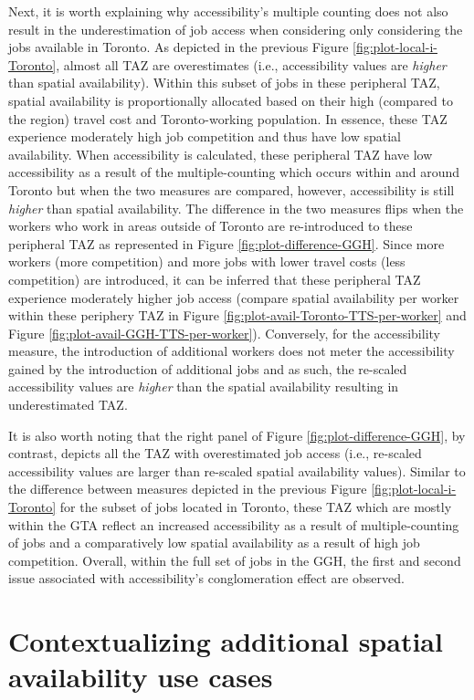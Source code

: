 \documentclass[]{elsarticle} %
\begin{document}
Next, it is worth explaining why accessibility's multiple counting does
not also result in the underestimation of job access when considering
only considering the jobs available in Toronto. As depicted in the
previous Figure \ref{fig:plot-local-i-Toronto}, almost all TAZ are
overestimates (i.e., accessibility values are \emph{higher} than spatial
availability). Within this subset of jobs in these peripheral TAZ,
spatial availability is proportionally allocated based on their high
(compared to the region) travel cost and Toronto-working population. In
essence, these TAZ experience moderately high job competition and thus
have low spatial availability. When accessibility is calculated, these
peripheral TAZ have low accessibility as a result of the
multiple-counting which occurs within and around Toronto but when the
two measures are compared, however, accessibility is still \emph{higher}
than spatial availability. The difference in the two measures flips when
the workers who work in areas outside of Toronto are re-introduced to
these peripheral TAZ as represented in Figure
\ref{fig:plot-difference-GGH}. Since more workers (more competition) and
more jobs with lower travel costs (less competition) are introduced, it
can be inferred that these peripheral TAZ experience moderately higher
job access (compare spatial availability per worker within these
periphery TAZ in Figure \ref{fig:plot-avail-Toronto-TTS-per-worker} and
Figure \ref{fig:plot-avail-GGH-TTS-per-worker}). Conversely, for the
accessibility measure, the introduction of additional workers does not
meter the accessibility gained by the introduction of additional jobs
and as such, the re-scaled accessibility values are \emph{higher} than
the spatial availability resulting in underestimated TAZ.

It is also worth noting that the right panel of Figure
\ref{fig:plot-difference-GGH}, by contrast, depicts all the TAZ with
overestimated job access (i.e., re-scaled accessibility values are
larger than re-scaled spatial availability values). Similar to the
difference between measures depicted in the previous Figure
\ref{fig:plot-local-i-Toronto} for the subset of jobs located in
Toronto, these TAZ which are mostly within the GTA reflect an increased
accessibility as a result of multiple-counting of jobs and a
comparatively low spatial availability as a result of high job
competition. Overall, within the full set of jobs in the GGH, the first
and second issue associated with accessibility's conglomeration effect
are observed.

\hypertarget{contextualizing-additional-spatial-availability-use-cases}{%
\section{Contextualizing additional spatial availability use
cases}\label{contextualizing-additional-spatial-availability-use-cases}}
\end{document}
